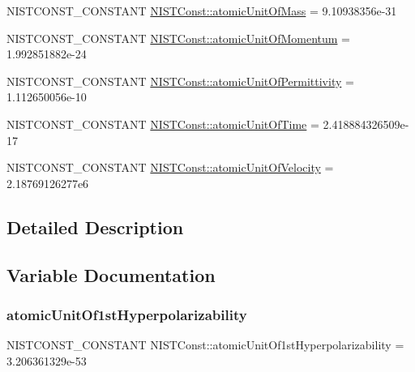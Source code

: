 \begin{DoxyCompactItemize}
\item 
N\+I\+S\+T\+C\+O\+N\+S\+T\+\_\+\+C\+O\+N\+S\+T\+A\+NT \mbox{\hyperlink{group___n_i_s_t_const-_atomic_unit_gaffbb7b29a9d92b540321f074f46903ae}{N\+I\+S\+T\+Const\+::atomic\+Unit\+Of\+Mass}} = 9.\+10938356e-\/31
\item 
N\+I\+S\+T\+C\+O\+N\+S\+T\+\_\+\+C\+O\+N\+S\+T\+A\+NT \mbox{\hyperlink{group___n_i_s_t_const-_atomic_unit_ga3a2d8ad829da0868381d6f31817ed453}{N\+I\+S\+T\+Const\+::atomic\+Unit\+Of\+Momentum}} = 1.\+992851882e-\/24
\item 
N\+I\+S\+T\+C\+O\+N\+S\+T\+\_\+\+C\+O\+N\+S\+T\+A\+NT \mbox{\hyperlink{group___n_i_s_t_const-_atomic_unit_ga150ae2f35ef916113c6bcf612b7fa8c8}{N\+I\+S\+T\+Const\+::atomic\+Unit\+Of\+Permittivity}} = 1.\+112650056e-\/10
\item 
N\+I\+S\+T\+C\+O\+N\+S\+T\+\_\+\+C\+O\+N\+S\+T\+A\+NT \mbox{\hyperlink{group___n_i_s_t_const-_atomic_unit_ga1dd9cd3a8f95c754529e663dc03d7b9e}{N\+I\+S\+T\+Const\+::atomic\+Unit\+Of\+Time}} = 2.\+418884326509e-\/17
\item 
N\+I\+S\+T\+C\+O\+N\+S\+T\+\_\+\+C\+O\+N\+S\+T\+A\+NT \mbox{\hyperlink{group___n_i_s_t_const-_atomic_unit_gaf53a1d1a7382eb03e12e980aeb34ded4}{N\+I\+S\+T\+Const\+::atomic\+Unit\+Of\+Velocity}} = 2.\+18769126277e6
\end{DoxyCompactItemize}


\subsection{Detailed Description}


\subsection{Variable Documentation}
\mbox{\label{group___n_i_s_t_const-_atomic_unit_gaa8a2a7516740737167afdeb3cd4ee584}} 
\subsubsection{\texorpdfstring{atomic\+Unit\+Of1st\+Hyperpolarizability}{atomicUnitOf1stHyperpolarizability}}
{\footnotesize\ttfamily N\+I\+S\+T\+C\+O\+N\+S\+T\+\_\+\+C\+O\+N\+S\+T\+A\+NT N\+I\+S\+T\+Const\+::atomic\+Unit\+Of1st\+Hyperpolarizability = 3.\+206361329e-\/53}

